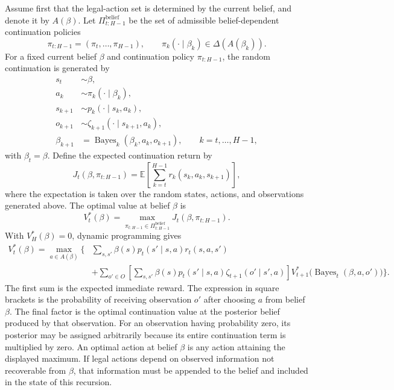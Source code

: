 Assume first that the legal-action set is determined by the current belief, and denote it by $A(\beta)$. Let $\Pi_{t:H-1}^{\mathrm{belief}}$ be the set of admissible belief-dependent continuation policies
\[
    \pi_{t:H-1}
    =
    (\pi_t,\ldots,\pi_{H-1}),
    \qquad
    \pi_k(\cdot\mid\beta_k)
    \in\Delta(A(\beta_k)).
\]
For a fixed current belief $\beta$ and continuation policy $\pi_{t:H-1}$, the random continuation is generated by
\[
\begin{aligned}
    s_t&\sim\beta,\\
    a_k&\sim\pi_k(\cdot\mid\beta_k),\\
    s_{k+1}&\sim p_k(\cdot\mid s_k,a_k),\\
    o_{k+1}&\sim\zeta_{k+1}(\cdot\mid s_{k+1},a_k),\\
    \beta_{k+1}
    &=\operatorname{Bayes}_k(\beta_k,a_k,o_{k+1}),
    \qquad k=t,\ldots,H-1,
\end{aligned}
\]
with $\beta_t=\beta$. Define the expected continuation return by
\[
    J_t(\beta,\pi_{t:H-1})
    =
    \mathbb{E}
    \left[
      \sum_{k=t}^{H-1}
      r_k(s_k,a_k,s_{k+1})
    \right],
\]
where the expectation is taken over the random states, actions, and observations generated above. The optimal value at belief $\beta$ is
\[
    V_t^\ast(\beta)
    =
    \max_{\pi_{t:H-1}\in\Pi_{t:H-1}^{\mathrm{belief}}}
    J_t(\beta,\pi_{t:H-1}).
\]
With $V_H^\ast(\beta)=0$, dynamic programming gives
\[
\begin{aligned}
    V_t^\ast(\beta)
    =\max_{a\in A(\beta)}
    \Biggl\{
      &\sum_{s,s'}
      \beta(s)p_t(s'\mid s,a)r_t(s,a,s')
      \\
      &+\sum_{o'\in O}
      \left[
        \sum_{s,s'}
        \beta(s)p_t(s'\mid s,a)
        \zeta_{t+1}(o'\mid s',a)
      \right]
      V_{t+1}^\ast
      \bigl(\operatorname{Bayes}_t(\beta,a,o')\bigr)
    \Biggr\}.
\end{aligned}
\]
The first sum is the expected immediate reward. The expression in square brackets is the probability of receiving observation $o'$ after choosing $a$ from belief $\beta$. The final factor is the optimal continuation value at the posterior belief produced by that observation. For an observation having probability zero, its posterior may be assigned arbitrarily because its entire continuation term is multiplied by zero. An optimal action at belief $\beta$ is any action attaining the displayed maximum. If legal actions depend on observed information not recoverable from $\beta$, that information must be appended to the belief and included in the state of this recursion.

